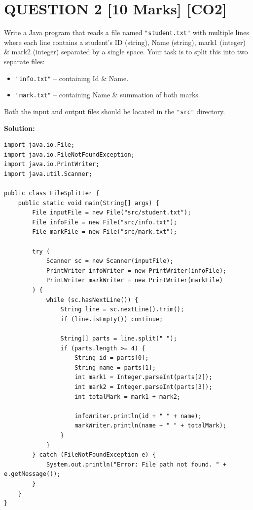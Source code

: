 \documentclass[11pt,a4paper]{article}
\begin{document}
\section*{QUESTION 2 \hfill [10 Marks] [CO2]}
Write a Java program that reads a file named \texttt{"student.txt"} with multiple lines where each line contains a student's ID (string), Name (string), mark1 (integer) \& mark2 (integer) separated by a single space.
Your task is to split this into two separate files:
\begin{itemize}
\item \texttt{"info.txt"} -- containing Id \& Name.
\item \texttt{"mark.txt"} -- containing Name \& summation of both marks.
\end{itemize}
Both the input and output files should be located in the \texttt{"src"} directory. 

\noindent\textbf{Solution:}
\begin{lstlisting}
import java.io.File;
import java.io.FileNotFoundException;
import java.io.PrintWriter;
import java.util.Scanner;

public class FileSplitter {
    public static void main(String[] args) {
        File inputFile = new File("src/student.txt");
        File infoFile = new File("src/info.txt");
        File markFile = new File("src/mark.txt");

        try (
            Scanner sc = new Scanner(inputFile);
            PrintWriter infoWriter = new PrintWriter(infoFile);
            PrintWriter markWriter = new PrintWriter(markFile)
        ) {
            while (sc.hasNextLine()) {
                String line = sc.nextLine().trim();
                if (line.isEmpty()) continue;
                
                String[] parts = line.split(" ");
                if (parts.length >= 4) {
                    String id = parts[0];
                    String name = parts[1];
                    int mark1 = Integer.parseInt(parts[2]);
                    int mark2 = Integer.parseInt(parts[3]);
                    int totalMark = mark1 + mark2;

                    infoWriter.println(id + " " + name);
                    markWriter.println(name + " " + totalMark);
                }
            }
        } catch (FileNotFoundException e) {
            System.out.println("Error: File path not found. " + e.getMessage());
        }
    }
}
\end{lstlisting}
\vspace{0.6cm}
\end{document}
